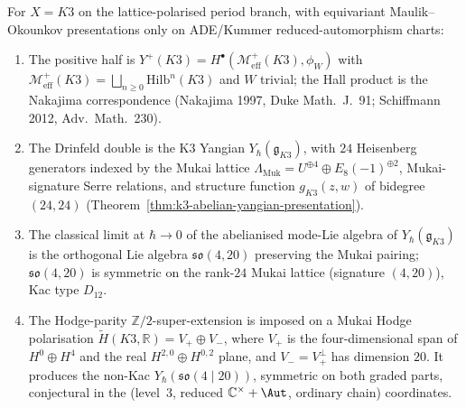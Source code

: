 \begin{theorem}[K3 Yangian as bulk at $d = 2$, lattice-period branch,
ordinary chain ambient]
\label{thm:bulk-k3-yangian}
For $X = K3$ on the lattice-polarised period branch, with equivariant
Maulik--Okounkov presentations only on ADE/Kummer reduced-automorphism
charts:
\begin{enumerate}[label=\textup{(\roman*)}]
\item The positive half is
$Y^{+}(K3) = H^{\bullet}(\mathcal M^{+}_{\mathrm{eff}}(K3),
\phi_{W})$ with $\mathcal M^{+}_{\mathrm{eff}}(K3) = \bigsqcup_{n \ge 0}
\mathrm{Hilb}^{n}(K3)$ and $W$ trivial; the Hall product is the
Nakajima correspondence (Nakajima 1997, Duke Math.\ J.\ 91; Schiffmann
2012, Adv.\ Math.\ 230).
\item The Drinfeld double is the K3 Yangian
$Y_{\hbar}(\mathfrak{g}_{K3})$, with $24$ Heisenberg generators
indexed by the Mukai lattice $\Lambda_{\mathrm{Muk}} = U^{\oplus 4}
\oplus E_{8}(-1)^{\oplus 2}$, Mukai-signature Serre relations, and
structure function $g_{K3}(z, w)$ of bidegree $(24, 24)$
(Theorem~\ref{thm:k3-abelian-yangian-presentation}).
\item The classical limit at $\hbar \to 0$ of the abelianised
mode-Lie algebra of $Y_{\hbar}(\mathfrak g_{K3})$ is the orthogonal
Lie algebra $\mathfrak{so}(4, 20)$ preserving the Mukai pairing;
$\mathfrak{so}(4, 20)$ is symmetric on the rank-$24$ Mukai
lattice (signature $(4, 20)$), Kac type $D_{12}$.
\item The Hodge-parity $\mathbb Z/2$-super-extension is imposed on a
Mukai Hodge polarisation
$\widetilde H(K3,\mathbb R)=V_+\oplus V_-$, where $V_+$ is the
four-dimensional span of $H^0\oplus H^4$ and the real
$H^{2,0}\oplus H^{0,2}$ plane, and $V_-=V_+^\perp$ has dimension $20$.
It produces the non-Kac $Y_{\hbar}(\mathfrak{so}(4 \mid 20))$,
symmetric on both graded parts, conjectural in the (level~$3$, reduced
$\mathbb C^\times + \Aut$, ordinary chain) coordinates.
\end{enumerate}
\end{theorem}

